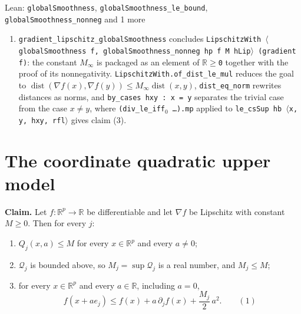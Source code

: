 \documentclass[11pt,a4paper]{article}
\begin{document}
\begin{leanbox}{Lean: \texttt{globalSmoothness}, \texttt{globalSmoothness\_\allowbreak{}le\_\allowbreak{}bound}, \texttt{globalSmoothness\_\allowbreak{}nonneg} and 1 more}
\begin{enumerate}
\item \texttt{gradient\_\allowbreak{}lipschitz\_\allowbreak{}global\allowbreak{}Smoothness} concludes \texttt{Lipschitz\allowbreak{}With \ensuremath{\langle}global\allowbreak{}Smoothness f, global\allowbreak{}Smoothness\_\allowbreak{}nonneg hp f M h\allowbreak{}Lip\ensuremath{\rangle} (gradient f)}: the constant \(M_\infty\) is packaged as an element of \texttt{\ensuremath{\mathbb R}\ensuremath{\ge}0} together with the proof of its nonnegativity. \texttt{Lipschitz\allowbreak{}With.\allowbreak{}of\_\allowbreak{}dist\_\allowbreak{}le\_\allowbreak{}mul} reduces the goal to \(\operatorname{dist}(\nabla f(x),\nabla f(y))\le M_\infty\operatorname{dist}(x,y)\), \texttt{dist\_\allowbreak{}eq\_\allowbreak{}norm} rewrites distances as norms, and \texttt{by\_\allowbreak{}cases hxy : x = y} separates the trivial case from the case \(x\ne y\), where \texttt{(div\_\allowbreak{}le\_\allowbreak{}iff\ensuremath{{}_{0}} …).\allowbreak{}mp} applied to \texttt{le\_\allowbreak{}cs\allowbreak{}Sup hb \ensuremath{\langle}x, y, hxy, rfl\ensuremath{\rangle}} gives claim (3).

\end{enumerate}
\end{leanbox}

\section{\texorpdfstring{The coordinate quadratic upper model}{The coordinate quadratic upper model}}


\textbf{Claim.} Let \(f:\mathbb R^p\to\mathbb R\) be differentiable and let \(\nabla f\) be Lipschitz with constant \(M\ge0\). Then for every \(j\):



\begin{enumerate}


\item \(Q_j(x,a)\le M\) for every \(x\in\mathbb R^p\) and every \(a\ne0\);

\item \(\mathcal Q_j\) is bounded above, so \(M_j=\sup\mathcal Q_j\) is a real number, and \(M_j\le M\);

\item for every \(x\in\mathbb R^p\) and every \(a\in\mathbb R\), including \(a=0\),
\[f(x+ae_j)\le f(x)+a\,\partial_jf(x)+\frac{M_j}{2}\,a^2.\qquad(1)\]

\end{enumerate}
\end{document}

